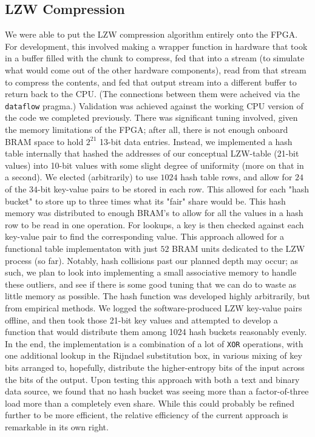 \documentclass{article}
\begin{document}
\subsection{LZW Compression}

We were able to put the LZW compression algorithm entirely onto the FPGA. For development, this involved making a wrapper function in hardware that took in a buffer filled with the chunk to compress, fed that into a stream (to simulate what would come out of the other hardware components), read from that stream to compress the contents, and fed that output stream into a different buffer to return back to the CPU. (The connections between them were acheived via the \texttt{dataflow} pragma.)
\newline\newline
Validation was achieved against the working CPU version of the code we completed previously. There was significant tuning involved, given the memory limitations of the FPGA; after all, there is not enough onboard BRAM space to hold $2^{21}$ 13-bit data entries. Instead, we implemented a hash table internally that hashed the addresses of our conceptual LZW-table (21-bit values) into 10-bit values with some slight degree of uniformity (more on that in a second). We elected (arbitrarily) to use $1024$ hash table rows, and allow for $24$ of the $34$-bit key-value pairs to be stored in each row. This allowed for each "hash bucket" to store up to three times what its "fair" share would be. 
\newline\newline
This hash memory was distributed to enough BRAM's to allow for all the values in a hash row to be read in one operation. For lookups, a key is then checked against each key-value pair to find the corresponding value. This approach allowed for a functional table implementaton with just $52$ BRAM units dedicated to the LZW process (so far).
\newline\newline
Notably, hash collisions past our planned depth may occur;  as such, we plan to look into implementing a small associative memory to handle these outliers, and see if there is some good tuning that we can do to waste as little memory as possible.
\newline\newline
The hash function was developed highly arbitrarily, but from empirical methods. We logged the software-produced LZW key-value pairs offline, and then took those 21-bit key values and attempted to develop a function that would distribute them among 1024 hash buckets reasonably evenly. In the end, the implementation is a combination of a lot of \texttt{XOR} operations, with one additional lookup in the Rijndael substitution box, in various mixing of key bits arranged to, hopefully, distribute the higher-entropy bits of the input across the bits of the output. Upon testing this approach with both a text and binary data source, we found that no hash bucket was seeing more than a factor-of-three load more than a completely even share. While this could probably be refined further to be more efficient, the relative efficiency of the current approach is remarkable in its own right.
\end{document}
